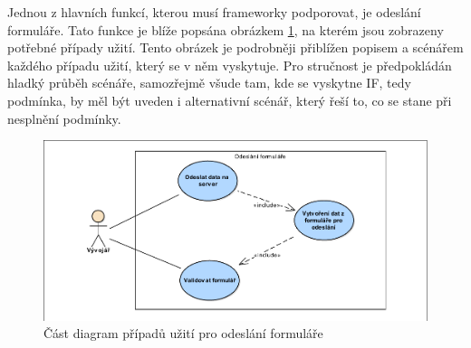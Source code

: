 Jednou z hlavních funkcí, kterou musí frameworky podporovat, je odeslání formuláře. Tato funkce je blíže popsána obrázkem \ref{img:useCaseModelFormSend}, na kterém jsou zobrazeny potřebné případy užití. Tento obrázek je podrobněji přiblížen popisem a scénářem každého případu užití, který se v něm vyskytuje. Pro stručnost je předpokládán hladký průběh scénáře, samozřejmě všude tam, kde se vyskytne IF, tedy podmínka, by měl být uveden i alternativní scénář, který řeší to, co se stane při nesplnění podmínky.
\begin{figure}[h!]
\includegraphics[width=\textwidth, trim=4 4 4 4, clip]{figures/useCaseFormSend}
\caption{Část diagram případů užití pro odeslání formuláře}
\label{img:useCaseModelFormSend}
\end{figure}

